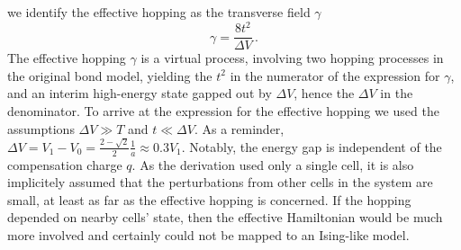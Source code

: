 %
we identify the effective hopping as the transverse field $\gamma$
%
\begin{equation}
  \label{eq:gamma}
  \gamma = \frac{8 t^2}{\Delta V} \, .
\end{equation}
%
The effective hopping $\gamma$ is a virtual process, involving two hopping
processes in the original bond model, yielding the $t^2$ in the numerator of the
expression for $\gamma$, and an interim high-energy state gapped out by $\Delta
V$, hence the $\Delta V$ in the denominator. To arrive at the expression for the
effective hopping we used the assumptions $\Delta V \gg T$ and $t \ll \Delta V$.
As a reminder, $\Delta V = V_1 - V_0 = \frac{2 - \sqrt{2}}{2} \frac{1}{a}
\approx 0.3 V_1$. Notably, the energy gap is independent of the compensation
charge $q$. As the derivation used only a single cell, it is also implicitely
assumed that the perturbations from other cells in the system are small, at
least as far as the effective hopping is concerned. If the hopping depended on
nearby cells' state, then the effective Hamiltonian would be much more involved
and certainly could not be mapped to an Ising-like model.

